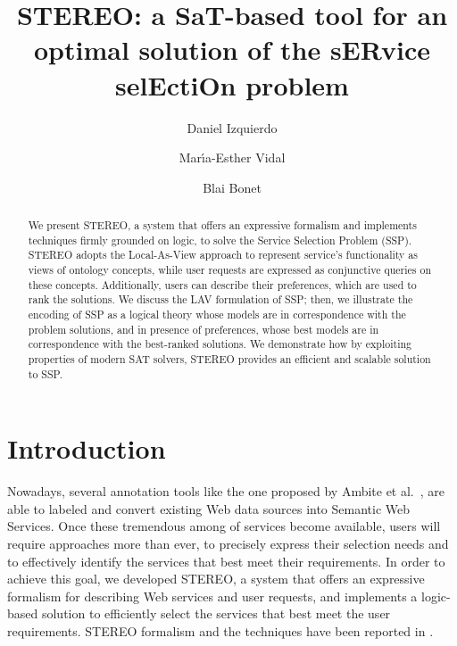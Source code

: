 \documentclass{llncs}
\begin{document}
\allowdisplaybreaks
\title{STEREO: a SaT-based tool for an optimal solution of the sERvice selEctiOn problem}
\author{Daniel Izquierdo \and Mar\'{\i}a-Esther Vidal \and Blai Bonet}
\maketitle

\begin{abstract}
We present STEREO, a system that offers an expressive formalism and implements techniques firmly grounded on logic, to solve the Service Selection Problem (SSP).
STEREO adopts the Local-As-View approach to represent service's functionality as 
views of ontology concepts, while user requests are expressed as conjunctive queries on these concepts. Additionally,  users can describe their preferences, which  are  used to rank the solutions. 
We discuss the LAV formulation  of SSP; then, we illustrate the encoding of SSP  as a logical theory  whose models are in correspondence with the problem solutions, and in presence of preferences, whose best models are in correspondence with the best-ranked solutions.  We demonstrate how by exploiting properties of  modern SAT solvers, STEREO provides an efficient and scalable solution  to  SSP. 
\end{abstract}

\section{Introduction}
Nowadays, several annotation tools like the one proposed by Ambite et al.\ \cite{AmbiteISWC09}, are able to labeled and convert existing Web data sources into Semantic Web Services.
Once these tremendous among of services become available, users
will require approaches  more than ever, to precisely express their selection needs and to effectively identify the services that best meet their requirements.
In order to achieve this goal, we developed  STEREO, a system that offers an expressive formalism for describing Web services and user requests,  and implements a logic-based solution to efficiently select the services that best meet the user requirements. STEREO formalism and the techniques have been reported in  \cite{IVB2010}.
 
\end{document}
